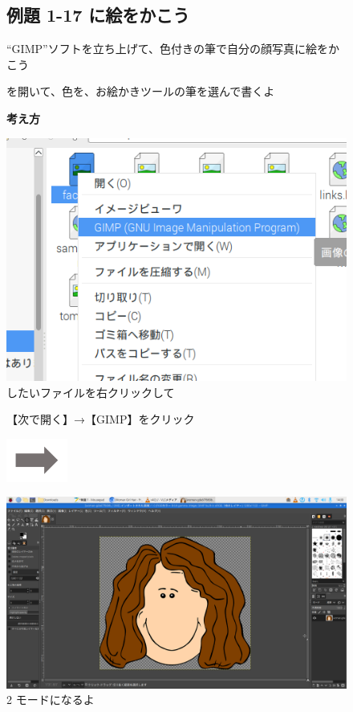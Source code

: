 \bigskip

\clearpage


\begin{figure}[ht]
  \subsection{例題 1-17 に絵をかこう}

  “GIMP”ソフトを立ち上げて、色付きの筆で自分の顔写真に絵をかこう

  を開いて、色を、お絵かきツールの筆を選んで書くよ

  \textbf{考え方}

  \begin{minipage}{0.4\textwidth}
    \centering
    \includegraphics[width=\linewidth]{text01-img/textbook-img124.png}\\
     したいファイルを右クリックして

    【次で開く】→【GIMP】をクリック
  \end{minipage}
  \includegraphics[width=2cm]{text01-img/textbook-img128.png}
  \begin{minipage}{0.4\textwidth}
    \includegraphics[width=\linewidth]{text01-img/textbook-img125.png}\\
      2 モードになるよ
  \end{minipage}
  

\end{figure}
